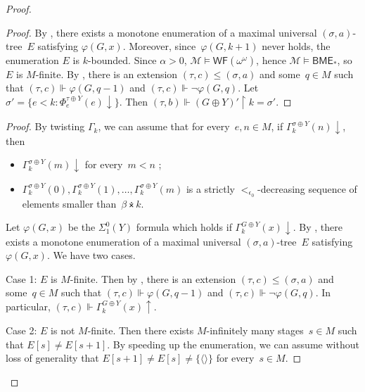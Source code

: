 \documentclass{article}
\numberwithin{theorem}{section}
\newtheorem{lemma}[theorem]{Lemma}
\newcommand{\WF}{\mathsf{WF}}
\newcommand{\BME}{\mathsf{BME}}
\newcommand{\M}{\mathcal{M}}
\newcommand{\uh}[0]{{\upharpoonright}}
\newcommand{\ntimes}{\dottimes}
\begin{document}
\begin{proof}
\begin{proof}
By , there exists a monotone enumeration of a maximal universal $(\sigma, a)$-tree~$E$ satisfying $\varphi(G, x)$.
Moreover, since~$\varphi(G, k+1)$ never holds, the enumeration $E$ is $k$-bounded.
Since $\alpha > 0$, $\M \models \WF(\omega^\omega)$, hence $\M \models \BME_*$, so $E$ is $M$-finite.
By , there is an extension $(\tau, c) \leq (\sigma, a)$ and some~$q \in M$ such that $(\tau, c) \Vdash \varphi(G, q-1)$ and $(\tau, c) \Vdash \neg \varphi(G, q)$.
Let~$\sigma' = \{ e < k : \Phi^{\tau \oplus Y}_e(e)\downarrow \}$. Then $(\tau,b) \Vdash (G \oplus Y)' \uh k = \sigma'$.
\end{proof}



\begin{proof}
By twisting $\Gamma_k$, we can assume that for every~$e, n \in M$, if $\Gamma^{\sigma \oplus Y}_k(n)\downarrow$, then
\begin{itemize}
    \item $\Gamma^{\sigma \oplus Y}_k(m)\downarrow$ for every~$m < n$ ;
    \item $\Gamma^{\sigma \oplus Y}_k(0), \Gamma^{\sigma \oplus Y}_k(1), \dots, \Gamma^{\sigma \oplus Y}_k(m)$ is a strictly $<_{\epsilon_0}$-decreasing sequence of elements smaller than~$\beta \ntimes k$.
\end{itemize}


Let $\varphi(G, x)$ be the $\Sigma^0_1(Y)$ formula which holds if $\Gamma^{G \oplus Y}_k(x)\downarrow$.
By , there exists a monotone enumeration of a maximal universal $(\sigma, a)$-tree~$E$ satisfying $\varphi(G, x)$. We have two cases.

Case 1: $E$ is $M$-finite. Then by , there is an extension $(\tau, c) \leq (\sigma, a)$ and some~$q \in M$ such that $(\tau, c) \Vdash \varphi(G, q-1)$ and $(\tau, c) \Vdash \neg \varphi(G, q)$. In particular, $(\tau, c) \Vdash \Gamma^{G \oplus Y}_k(x)\uparrow$.

Case 2: $E$ is not $M$-finite. Then there exists $M$-infinitely many stages~$s \in M$ such that $E[s] \neq E[s+1]$.
By speeding up the enumeration, we can assume without loss of generality that $E[s+1] \neq E[s] \neq \{\langle\rangle\}$ for every~$s \in M$.


\end{proof}
\end{proof}
\end{document}
